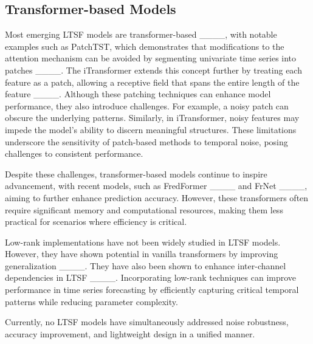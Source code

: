 
\subsection{Transformer-based Models} \label{sub sec: related works transformers}
Most emerging \ac{LTSF} models are transformer-based ____, with notable examples such as PatchTST, which demonstrates that modifications to the attention mechanism can be avoided by segmenting univariate time series into patches ____. The iTransformer extends this concept further by treating each feature as a patch, allowing a receptive field that spans the entire length of the feature ____. Although these patching techniques can enhance model performance, they also introduce challenges. For example, a noisy patch can obscure the underlying patterns. Similarly, in iTransformer, noisy features may impede the model's ability to discern meaningful structures. These limitations underscore the sensitivity of patch-based methods to temporal noise, posing challenges to consistent performance.

Despite these challenges, transformer-based models continue to inspire advancement, with recent models, such as FredFormer ____ and FrNet ____, aiming to further enhance prediction accuracy. However, these transformers often require significant memory and computational resources, making them less practical for scenarios where efficiency is critical.

Low-rank implementations have not been widely studied in \ac{LTSF} models. However, they have shown potential in vanilla transformers by improving generalization ____. They have also been shown to enhance inter-channel dependencies in \ac{LTSF} ____. Incorporating low-rank techniques can improve performance in time series forecasting by efficiently capturing critical temporal patterns while reducing parameter complexity.

Currently, no \ac{LTSF} models have simultaneously addressed noise robustness, accuracy improvement, and lightweight design in a unified manner.